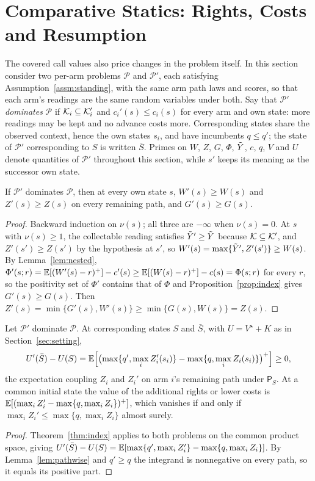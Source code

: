\section{Comparative Statics: Rights, Costs and Resumption}
\label{sec:comparative}

The covered call values also price changes in the problem itself. In this section consider two per-arm problems $\mathcal P$ and $\mathcal P'$, each satisfying Assumption~\ref{assm:standing}, with the same arm path laws and scores, so that each arm's readings are the same random variables under both. Say that $\mathcal P'$ \emph{dominates} $\mathcal P$ if $\mathcal{K}_i\subseteq\mathcal{K}_i'$ and
$c_i'(s)\le c_i(s)$ for every arm and own state: more readings may be kept and
no advance costs more. Corresponding states share the observed context, hence the own states $s_i$, and have incumbents $q\le q'$; the state of $\mathcal P'$ corresponding to $S$ is written $\bar S$. Primes on $W$, $Z$, $G$, $\Phi$, $\tilde Y$, $c$, $q$, $V$ and $U$ denote quantities of $\mathcal P'$ throughout this section, while $s'$ keeps its meaning as the successor own state.

\begin{lemma}\label{lem:pathwise}
If $\mathcal P'$ dominates $\mathcal P$, then at every own state $s$,
$W'(s)\ge W(s)$ and $Z'(s)\ge Z(s)$ on every remaining path, and $G'(s)\ge G(s)$.
\end{lemma}
\begin{proof}
Backward induction on $\nu(s)$; all three are $-\infty$ when $\nu(s)=0$. At $s$
with $\nu(s)\ge1$, the collectable reading satisfies $\tilde Y'\ge\tilde Y$ because
$\mathcal{K}\subseteq\mathcal{K}'$, and $Z'(s')\ge Z(s')$ by the hypothesis at $s'$, so
$W'(s)=\max\{\tilde Y',Z'(s')\}\ge W(s)$. By Lemma~\ref{lem:nested},
$\Phi'(s;r)=\mathbb{E}[(W'(s)-r)^+]-c'(s)\ge\mathbb{E}[(W(s)-r)^+]-c(s)=\Phi(s;r)$ for every
$r$, so the positivity set of $\Phi'$ contains that of $\Phi$ and
Proposition~\ref{prop:index} gives $G'(s)\ge G(s)$. Then
$Z'(s)=\min\{G'(s),W'(s)\}\ge\min\{G(s),W(s)\}=Z(s)$.
\end{proof}

\begin{proposition}\label{prop:comparative}
Let $\mathcal P'$ dominate $\mathcal P$. At corresponding states $S$ and $\bar S$, with $U=V^\star+K$ as in Section~\ref{sec:setting}, \[ U'(\bar S)-U(S)=\mathbb{E}\Bigl[\bigl(\max\{q',\max_iZ_i'(s_i)\}-\max\{q,\max_iZ_i(s_i)\}\bigr)^+\Bigr]\ge0,
\]
the expectation coupling $Z_i$ and $Z_i'$ on arm $i$'s remaining path under
$\mathsf P_S$. At a common initial state the value of the additional rights or
lower costs is $\mathbb{E}[(\max_iZ_i'-\max\{q,\max_iZ_i\})^+]$, which vanishes if and
only if $\max_iZ_i'\le\max\{q,\max_iZ_i\}$ almost surely.
\end{proposition}
\begin{proof}
Theorem~\ref{thm:index} applies to both problems on the common product space, giving $U'(\bar S)-U(S)=\mathbb{E}[\max\{q',\max_iZ_i'\}-\max\{q,\max_iZ_i\}]$. By
Lemma~\ref{lem:pathwise} and $q'\ge q$ the integrand is nonnegative on every
path, so it equals its positive part.
\end{proof}

